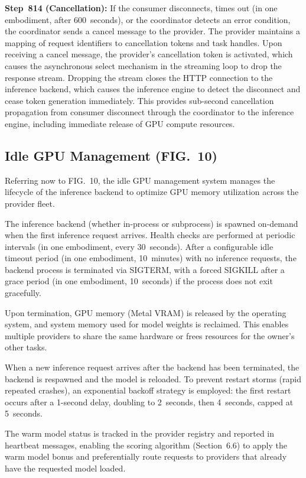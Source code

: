 \documentclass[11pt,letterpaper]{article}
\begin{document}
\textbf{Step~814 (Cancellation):} If the consumer disconnects, times out (in one embodiment, after 600~seconds), or the coordinator detects an error condition, the coordinator sends a cancel message to the provider. The provider maintains a mapping of request identifiers to cancellation tokens and task handles. Upon receiving a cancel message, the provider's cancellation token is activated, which causes the asynchronous select mechanism in the streaming loop to drop the response stream. Dropping the stream closes the HTTP connection to the inference backend, which causes the inference engine to detect the disconnect and cease token generation immediately. This provides sub-second cancellation propagation from consumer disconnect through the coordinator to the inference engine, including immediate release of GPU compute resources.

\subsection{Idle GPU Management (FIG.~10)}

Referring now to FIG.~10, the idle GPU management system manages the lifecycle of the inference backend to optimize GPU memory utilization across the provider fleet.

The inference backend (whether in-process or subprocess) is spawned on-demand when the first inference request arrives. Health checks are performed at periodic intervals (in one embodiment, every 30~seconds). After a configurable idle timeout period (in one embodiment, 10~minutes) with no inference requests, the backend process is terminated via SIGTERM, with a forced SIGKILL after a grace period (in one embodiment, 10~seconds) if the process does not exit gracefully.

Upon termination, GPU memory (Metal VRAM) is released by the operating system, and system memory used for model weights is reclaimed. This enables multiple providers to share the same hardware or frees resources for the owner's other tasks.

When a new inference request arrives after the backend has been terminated, the backend is respawned and the model is reloaded. To prevent restart storms (rapid repeated crashes), an exponential backoff strategy is employed: the first restart occurs after a 1-second delay, doubling to 2~seconds, then 4~seconds, capped at 5~seconds.

The warm model status is tracked in the provider registry and reported in heartbeat messages, enabling the scoring algorithm (Section~6.6) to apply the warm model bonus and preferentially route requests to providers that already have the requested model loaded.
\end{document}
